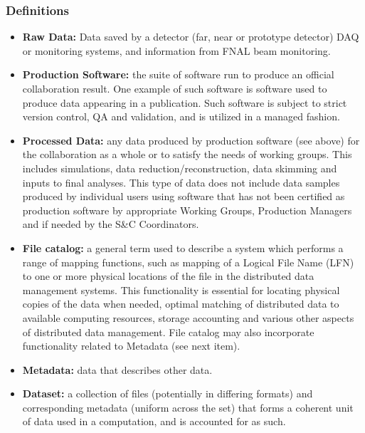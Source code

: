 \subsubsection{Definitions}
\label{sec:req-data-definitions}
\begin{itemize}
\item \textbf{Raw Data:} Data saved by a detector (far, near or prototype detector) DAQ or monitoring systems, and information from FNAL beam monitoring.

\item \textbf{Production Software:} the suite of software run to produce an official collaboration result. One example of such software is software used to produce data appearing in a publication. Such software is subject to strict version control, QA and validation, and is utilized in a managed fashion.

\item \textbf{Processed Data:} any data produced by production software (see above) for the collaboration as a whole or to satisfy the needs of working groups.  This includes simulations, data reduction/reconstruction, data skimming and inputs to final analyses. This type of data does not include data samples produced by individual users using software that has not been certified as production software by appropriate Working Groups, Production Managers and if needed by the S\&C Coordinators.

\item \textbf{File catalog:} a general term used to describe a system which performs a range of mapping functions, such as mapping of a Logical File Name (LFN) to one or more physical locations of the file in the distributed data management systems. This functionality is essential for locating physical copies of the data when needed, optimal matching of distributed data to available computing resources, storage accounting and various other aspects of distributed data management. File catalog may also incorporate functionality related to Metadata (see next item).

\item \textbf{Metadata:} data that describes other data.

\item \textbf{Dataset:} a collection of files (potentially in differing formats) and corresponding metadata (uniform across the set) that forms a coherent unit of data used in a computation, and is accounted for as such.
\end{itemize}

